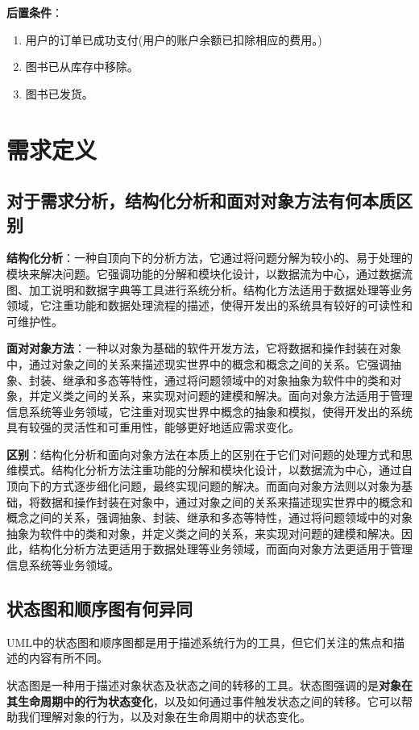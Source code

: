 \documentclass[11pt, a4paper, oneside]{ctexbook}
\begin{document}
\textbf{后置条件}：
\begin{enumerate}
    \item 用户的订单已成功支付(用户的账户余额已扣除相应的费用。)
    \item 图书已从库存中移除。
    \item 图书已发货。
\end{enumerate}
\chapter{需求定义}
\section{对于需求分析，结构化分析和面对对象方法有何本质区别}
\textbf{结构化分析}：一种自顶向下的分析方法，它通过将问题分解为较小的、易于处理的模块来解决问题。它强调功能的分解和模块化设计，以数据流为中心，通过数据流图、加工说明和数据字典等工具进行系统分析。结构化方法适用于数据处理等业务领域，它注重功能和数据处理流程的描述，使得开发出的系统具有较好的可读性和可维护性。

\textbf{面对对象方法}：一种以对象为基础的软件开发方法，它将数据和操作封装在对象中，通过对象之间的关系来描述现实世界中的概念和概念之间的关系。它强调抽象、封装、继承和多态等特性，通过将问题领域中的对象抽象为软件中的类和对象，并定义类之间的关系，来实现对问题的建模和解决。面向对象方法适用于管理信息系统等业务领域，它注重对现实世界中概念的抽象和模拟，使得开发出的系统具有较强的灵活性和可重用性，能够更好地适应需求变化。

\textbf{区别}：结构化分析和面向对象方法在本质上的区别在于它们对问题的处理方式和思维模式。结构化分析方法注重功能的分解和模块化设计，以数据流为中心，通过自顶向下的方式逐步细化问题，最终实现问题的解决。而面向对象方法则以对象为基础，将数据和操作封装在对象中，通过对象之间的关系来描述现实世界中的概念和概念之间的关系，强调抽象、封装、继承和多态等特性，通过将问题领域中的对象抽象为软件中的类和对象，并定义类之间的关系，来实现对问题的建模和解决。因此，结构化分析方法更适用于数据处理等业务领域，而面向对象方法更适用于管理信息系统等业务领域。

\section{状态图和顺序图有何异同}
UML中的状态图和顺序图都是用于描述系统行为的工具，但它们关注的焦点和描述的内容有所不同。

状态图是一种用于描述对象状态及状态之间的转移的工具。状态图强调的是\textbf{对象在其生命周期中的行为状态变化}，以及如何通过事件触发状态之间的转移。它可以帮助我们理解对象的行为，以及对象在生命周期中的状态变化。
\end{document}
